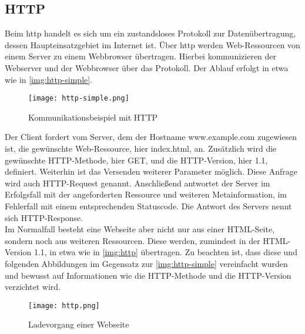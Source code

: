 \subsection{HTTP}
\label{sec:http}

Beim \ac{http} handelt es sich um ein zustandsloses Protokoll zur Datenübertragung, dessen Haupteinsatzgebiet im Internet ist. Über \ac{http} werden Web-Ressourcen von einem Server zu einem Webbrowser übertragen. Hierbei kommunizieren der Webserver und der Webbrowser über das Protokoll. Der Ablauf erfolgt in etwa wie in \autoref{img:http-simple}.

\begin{figure}[H]
	\begin{center}
		\texttt{[image: http-simple.png]}
		\caption{Kommunikationsbeispiel mit HTTP}
		\label{img:http-simple}
	\end{center}
\end{figure}

%	

Der Client fordert vom Server, dem der Hostname www.example.com zugewiesen ist, die gewünschte Web-Ressource, hier index.html, an. Zusätzlich wird die gewünschte HTTP-Methode, hier GET, und die HTTP-Version, hier 1.1, definiert. Weiterhin ist das Versenden weiterer Parameter möglich. Diese Anfrage wird auch HTTP-Request genannt. Anschließend antwortet der Server im Erfolgsfall mit der angeforderten Ressource und weiteren Metainformation, im Fehlerfall mit einem entsprechenden Statuscode. Die Antwort des Servers nennt sich HTTP-Response.\\
Im Normalfall besteht eine Webseite aber nicht nur aus einer HTML-Seite, sondern noch aus weiteren Ressourcen. Diese werden, zumindest in der HTML-Version 1.1, in etwa wie in \autoref{img:http} übertragen. Zu beachten ist, dass diese und folgenden Abbildungen im Gegensatz zur \autoref{img:http-simple} vereinfacht wurden und bewusst auf Informationen wie die HTTP-Methode und die HTTP-Version verzichtet wird.

\begin{figure}[H]
	\begin{center}
		\texttt{[image: http.png]}
		\caption{Ladevorgang einer Webseite}
		\label{img:http}
	\end{center}
\end{figure}


